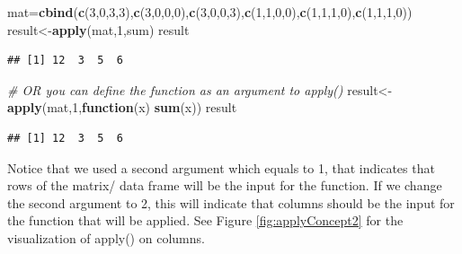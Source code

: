 \documentclass[12pt,]{krantz}
\newenvironment{Shaded}{\begin{snugshade}}{\end{snugshade}}
\newcommand{\CommentTok}[1]{\textcolor[rgb]{0.56,0.35,0.01}{\textit{#1}}}
\newcommand{\ControlFlowTok}[1]{\textcolor[rgb]{0.13,0.29,0.53}{\textbf{#1}}}
\newcommand{\DecValTok}[1]{\textcolor[rgb]{0.00,0.00,0.81}{#1}}
\newcommand{\KeywordTok}[1]{\textcolor[rgb]{0.13,0.29,0.53}{\textbf{#1}}}
\newcommand{\NormalTok}[1]{#1}
\begin{document}
\begin{Shaded}
\begin{Highlighting}[]
\NormalTok{mat=}\KeywordTok{cbind}\NormalTok{(}\KeywordTok{c}\NormalTok{(}\DecValTok{3}\NormalTok{,}\DecValTok{0}\NormalTok{,}\DecValTok{3}\NormalTok{,}\DecValTok{3}\NormalTok{),}\KeywordTok{c}\NormalTok{(}\DecValTok{3}\NormalTok{,}\DecValTok{0}\NormalTok{,}\DecValTok{0}\NormalTok{,}\DecValTok{0}\NormalTok{),}\KeywordTok{c}\NormalTok{(}\DecValTok{3}\NormalTok{,}\DecValTok{0}\NormalTok{,}\DecValTok{0}\NormalTok{,}\DecValTok{3}\NormalTok{),}\KeywordTok{c}\NormalTok{(}\DecValTok{1}\NormalTok{,}\DecValTok{1}\NormalTok{,}\DecValTok{0}\NormalTok{,}\DecValTok{0}\NormalTok{),}\KeywordTok{c}\NormalTok{(}\DecValTok{1}\NormalTok{,}\DecValTok{1}\NormalTok{,}\DecValTok{1}\NormalTok{,}\DecValTok{0}\NormalTok{),}\KeywordTok{c}\NormalTok{(}\DecValTok{1}\NormalTok{,}\DecValTok{1}\NormalTok{,}\DecValTok{1}\NormalTok{,}\DecValTok{0}\NormalTok{))}
\NormalTok{result<-}\KeywordTok{apply}\NormalTok{(mat,}\DecValTok{1}\NormalTok{,sum)}
\NormalTok{result}
\end{Highlighting}
\end{Shaded}

\begin{verbatim}
## [1] 12  3  5  6
\end{verbatim}

\begin{Shaded}
\begin{Highlighting}[]
\CommentTok{# OR you can define the function as an argument to apply()}
\NormalTok{result<-}\KeywordTok{apply}\NormalTok{(mat,}\DecValTok{1}\NormalTok{,}\ControlFlowTok{function}\NormalTok{(x) }\KeywordTok{sum}\NormalTok{(x))}
\NormalTok{result}
\end{Highlighting}
\end{Shaded}

\begin{verbatim}
## [1] 12  3  5  6
\end{verbatim}

Notice that we used a second argument which equals to 1, that indicates that rows of the matrix/ data frame will be the input for the function. If we change the second argument to 2, this will indicate that columns should be the input for the function that will be applied. See Figure \ref{fig:applyConcept2} for the visualization of apply() on columns.
\end{document}

